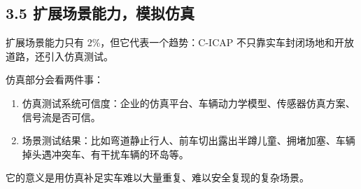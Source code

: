 \subsection{3.5 扩展场景能力，模拟仿真}

扩展场景能力只有 2\%，但它代表一个趋势：C-ICAP 不只靠实车封闭场地和开放道路，还引入仿真测试。

仿真部分会看两件事：

\begin{enumerate}
  \item 仿真测试系统可信度：企业的仿真平台、车辆动力学模型、传感器仿真方案、信号流是否可信。
  \item 场景测试结果：比如弯道静止行人、前车切出露出半蹲儿童、拥堵加塞、车辆掉头遇冲突车、有干扰车辆的环岛等。
\end{enumerate}

它的意义是用仿真补足实车难以大量重复、难以安全复现的复杂场景。

